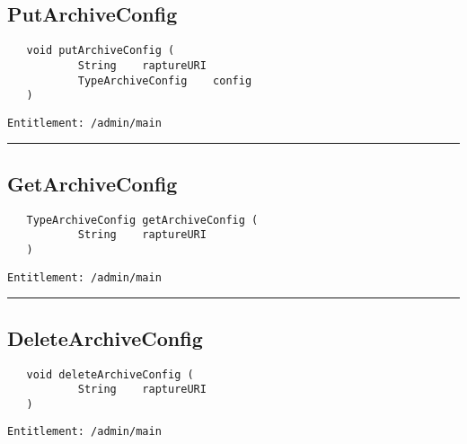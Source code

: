 \subsection{PutArchiveConfig}
\label{Api:PutArchiveConfig}
\begin{Verbatim}
   void putArchiveConfig (
           String    raptureURI
           TypeArchiveConfig    config
   )
\end{Verbatim}
\begin{Verbatim}[formatcom=\color{Maroon}]
  Entitlement: /admin/main
\end{Verbatim}



\rule{12cm}{2pt}
\subsection{GetArchiveConfig}
\label{Api:GetArchiveConfig}
\begin{Verbatim}
   TypeArchiveConfig getArchiveConfig (
           String    raptureURI
   )
\end{Verbatim}
\begin{Verbatim}[formatcom=\color{Maroon}]
  Entitlement: /admin/main
\end{Verbatim}



\rule{12cm}{2pt}
\subsection{DeleteArchiveConfig}
\label{Api:DeleteArchiveConfig}
\begin{Verbatim}
   void deleteArchiveConfig (
           String    raptureURI
   )
\end{Verbatim}
\begin{Verbatim}[formatcom=\color{Maroon}]
  Entitlement: /admin/main
\end{Verbatim}



